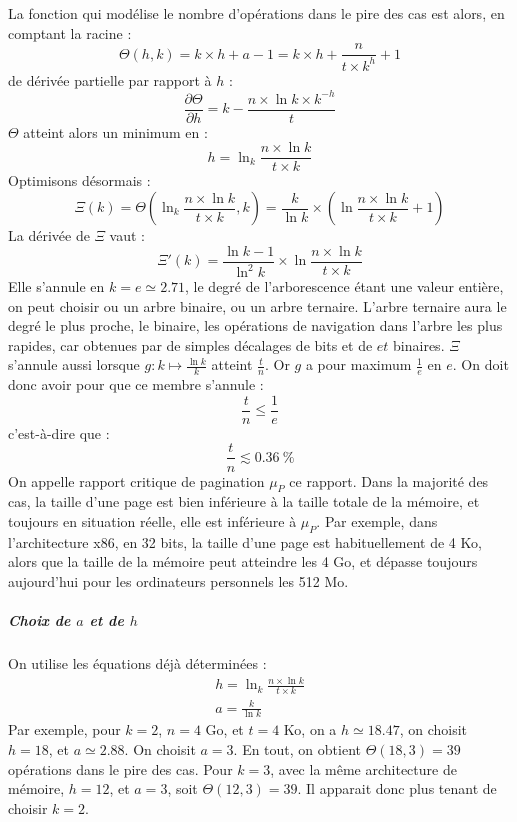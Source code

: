 \documentclass{article}
\begin{document}
La fonction qui modélise le nombre d'opérations dans le pire des cas est alors, en comptant la racine :
\begin{equation}
\Theta \left(h, k\right) = k \times h + a - 1= k \times h + \frac{n}{t \times k^{h}} + 1
\end{equation}
de dérivée partielle par rapport à $h$ : \[ \frac{\partial\Theta}{\partial h} = k - \frac{n \times \ln k \times k^{-h}}{t} \]
$\Theta$ atteint alors un minimum en :
\begin{equation}
h = \ln_{k} \frac{n \times \ln k}{t \times k} 
\end{equation}
Optimisons désormais : 
\[  \Xi \left(k\right) = \Theta \left( \ln_{k} \frac{n \times \ln k}{t \times k} , k \right) = \frac{k}{\ln k} \times \left( \ln \frac{n \times \ln k}{t \times k} + 1 \right) \]
La dérivée de $\Xi$ vaut :
\begin{equation}
\Xi'\left(k\right) =\frac{\ln k -1}{\ln^{2} k} \times \ln \frac{n \times \ln k}{t \times k}
\end{equation}
Elle s'annule en $ k = e \simeq 2.71$, le degré de l'arborescence étant une valeur entière, on peut choisir ou un arbre binaire, ou un arbre ternaire. L'arbre ternaire aura le degré le plus proche, le binaire, les opérations de navigation dans l'arbre les plus rapides, car obtenues par de simples décalages de bits et de $et$ binaires. $\Xi$ s'annule aussi  lorsque $ g : k \mapsto \frac{\ln k}{k} $ atteint  $ \frac{t}{n} $. Or $g$ a pour maximum
 $\frac{1}{e}$ en $e$. On doit donc avoir pour que ce membre s'annule : 
\begin{equation}
\frac{t}{n} \leqslant  \frac{1}{e}
\end{equation}
c'est-à-dire que :
\begin{equation}
\frac{t}{n} \lesssim 0.36 \ \%
\end{equation}
On appelle rapport critique de pagination $\mu_{P}$ ce rapport. Dans la majorité des cas, la taille d'une page est bien inférieure à la taille totale de la mémoire, et toujours en situation réelle, elle est inférieure à $\mu_{P}$. Par exemple, dans l'architecture
x86, en 32 bits, la taille d'une page est habituellement de 4 Ko, alors que la taille de la  mémoire peut atteindre les 4 Go, et dépasse toujours aujourd'hui pour les ordinateurs personnels les 512 Mo. 
\subparagraph*{Choix de $a$ et de $h$}
On utilise les équations déjà déterminées :
\begin{eqnarray}
h = \ln_{k} \frac{n \times \ln k}{t \times k} \\
a = \frac{k}{\ln k}
\end{eqnarray}
Par exemple, pour $k=2$, $n=4$ Go, et $t=4$ Ko, on a $h \simeq 18.47$, on choisit $h =18$, et $a \simeq 2.88$. On choisit $a=3$. En tout, on obtient $\Theta(18,3) = 39$ opérations dans le pire des cas.
Pour $k=3$, avec la même architecture de mémoire, $h=12$, et $a=3$, soit $\Theta(12, 3)=39$.
Il apparait donc plus tenant de choisir $k=2$.
\end{document}
